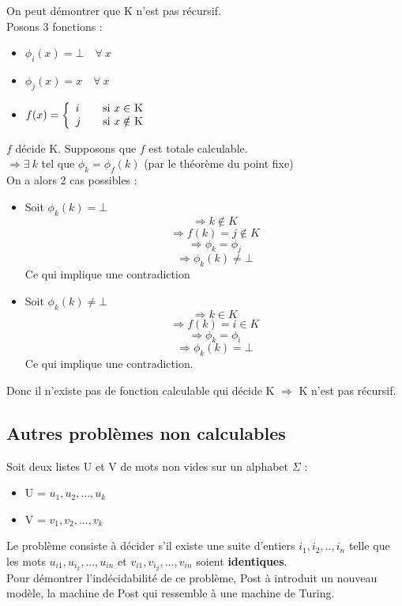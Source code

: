 \begin{myrem}
	On peut démontrer que K n'est pas récursif.\\
	Posons 3 fonctions :
	\begin{itemize}
		\item $\phi_i(x) = \bot \quad \forall \ x$
		\item $\phi_j(x) = x \quad \forall  \ x$
		\item $ f(x) = \left\{
		\begin{array}{l l}
			i & \quad \text{si $x\in$ K}\\
    		j & \quad \text{si $x\notin$ K}
		\end{array} \right.$
	\end{itemize}
	$f$ décide K. Supposons que $f$ est totale calculable. \\
	$ \Rightarrow \exists \ k$ tel que $\phi_k = \phi_f(k)$ (par le théorème
du point fixe)\\
	On a alors 2 cas possibles :
	\begin{itemize}
		\item Soit $\phi_k(k)=\bot$
			\[ \Rightarrow k \notin K\]
			\[ \Rightarrow f(k)=j \notin K\]
			\[ \Rightarrow \phi_k = \phi_j \]
			\[ \Rightarrow \phi_k(k) \neq \bot\]
			Ce qui implique une contradiction
		\item Soit $\phi_k(k) \neq \bot$
			\[ \Rightarrow k \in K\]
			\[ \Rightarrow f(k)=i \in K\]
			\[ \Rightarrow \phi_k = \phi_i \]
			\[ \Rightarrow \phi_k(k) = \bot\]
			Ce qui implique une contradiction.
	\end{itemize}
	Donc il n'existe pas de fonction calculable qui décide K $ \Rightarrow$ K n'est pas récursif.
\end{myrem}

\subsection{Autres problèmes non calculables}
\label{sub:autres_probl_mes_non_calculable}

\begin{mydef} Soit deux listes U et V 
	de mots non vides sur un alphabet $\Sigma$ : 
	\begin{itemize}
		\item U = ${u_1,u_2,...,u_k}$
		\item V = ${v_1,v_2,...,v_k}$
	\end{itemize}
	Le problème consiste à décider s’il existe une suite d'entiers 
	$i_1,i_2,..,i_n$ telle que les mots $u_{i1},u_{i_2},...,u_{in}$ et 
	$v_{i1},v_{i_2},...,v_{in}$ soient \textbf{identiques}. \\
	Pour démontrer l'indécidabilité de ce problème, Post à introduit un 
	nouveau modèle, la machine de Post qui ressemble à une machine de Turing.
\end{mydef}

